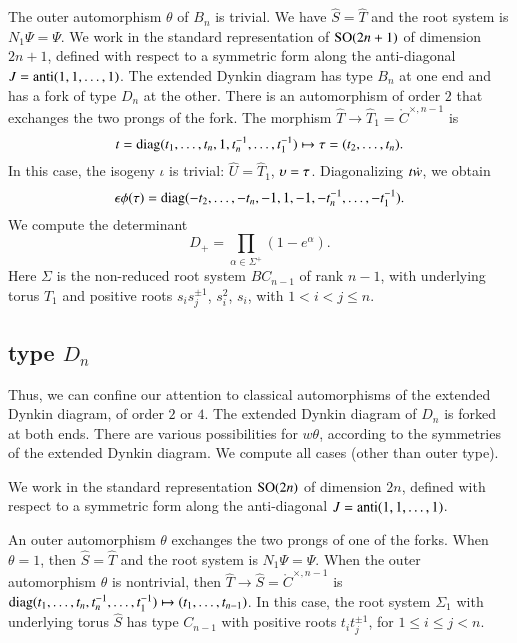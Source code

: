The outer automorphism $\theta$ of $B_n$ is trivial.  We have $\hat S
= \hat T$ and the root system is $N_1\Psi =\Psi$.  We work in the
standard representation of ${\operatorname{SO}}(2n+1)$ of dimension $2n+1$,
defined with respect to a symmetric form along the anti-diagonal $J =
{\operatorname{anti}}(1,1,\ldots,1)$.  The extended Dynkin diagram has type $B_n$
at one end and has a fork of type $D_n$ at the other.  There is an
automorphism of order $2$ that exchanges the two prongs of the fork.
The morphism $\hat T\to \hat T_1=\ring{C}^{\times,n-1}$ is
\[
t = {\operatorname{diag}}(t_1,\ldots,t_n,1,t_n^{-1},\ldots,t_1^{-1})
\mapsto \tau = (t_2,\ldots,t_n).
\]
In this case, the isogeny $\iota$ is trivial: $\hat U= \hat T_1$,
$\upsilon=\tau$.  Diagonalizing $t\dot w$, we obtain
\begin{equation}
\epsilon\phi(\tau) 
= {\operatorname{diag}}(-t_2,\ldots,-t_n,-1,1,-1,-t_n^{-1},\ldots,-t_1^{-1}).
\end{equation}
We compute the determinant
\begin{equation}
D_+ = \prod_{\alpha\in \Sigma^+} (1-e^\alpha).
\end{equation}
Here $\Sigma$ is the non-reduced root system $BC_{n-1}$ of rank $n-1$,
with underlying torus $\hat T_1$ and positive roots $s_i s_j^{\pm 1}$,
$s_i^2$, $s_i$, with $1<i<j\le n$.

\subsection{type $D_n$}\label{sec:dn}

Thus, we can confine our attention to classical automorphisms of the
extended Dynkin diagram, of order $2$ or $4$.  The extended Dynkin
diagram of $D_n$ is forked at both ends.  There are various
possibilities for $w\theta$, according to the symmetries of the
extended Dynkin diagram.  We compute all cases (other than outer
type).

We work in the standard representation ${\operatorname{SO}}(2n)$ of dimension
$2n$, defined with respect to a symmetric form along the anti-diagonal
$J = {\operatorname{anti}}(1,1,\ldots,1)$.

An outer automorphism $\theta$ exchanges the two prongs of one of the
forks.  When $\theta=1$, then $\hat S = \hat T$ and the root system is
$N_1\Psi = \Psi$.  When the outer automorphism $\theta$ is nontrivial,
then $\hat T\to \hat S =\ring{C}^{\times,n-1}$ is
${\operatorname{diag}}(t_1,\ldots,t_n,t_n^{-1},\ldots,t_1^{-1})\mapsto
(t_1,\ldots,t_{n-1})$.  In this case, the root system $\Sigma_1$ with
underlying torus $\hat S$ has type $C_{n-1}$ with positive roots $t_i
t_j^{\pm 1}$, for $1\le i\le j<n$.

